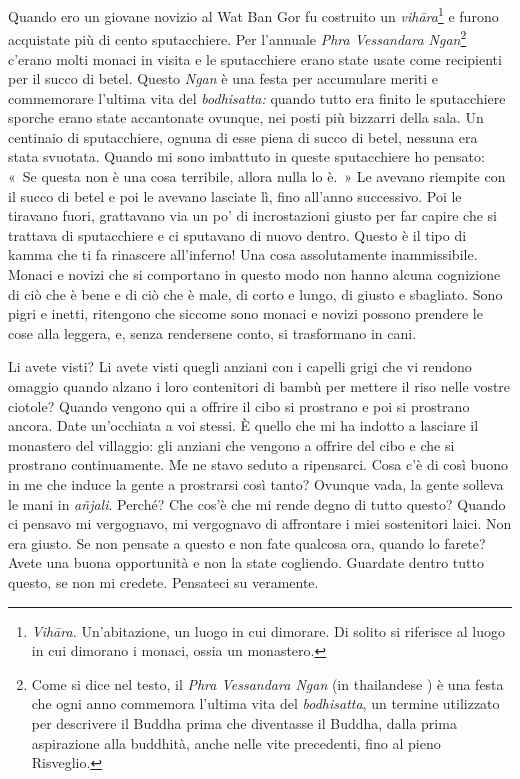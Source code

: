 Quando ero un giovane novizio al Wat Ban Gor fu costruito un
\emph{vihāra}\footnote{\emph{Vihāra.} Un'abitazione, un luogo in cui
  dimorare. Di solito si riferisce al luogo in cui dimorano i monaci,
  ossia un monastero.} e furono acquistate più di cento sputacchiere.
Per l'annuale \emph{Phra Vessandara Ngan}\footnote{Come si dice nel
  testo, il \emph{Phra Vessandara Ngan} (in thailandese ) è
  una festa che ogni anno commemora l'ultima vita del \emph{bodhisatta},
  un termine utilizzato per descrivere il Buddha prima che diventasse il
  Buddha, dalla prima aspirazione alla buddhità, anche nelle vite
  precedenti, fino al pieno Risveglio.} c'erano molti monaci in visita e
le sputacchiere erano state usate come recipienti per il succo di betel.
Questo \emph{Ngan} è una festa per accumulare meriti e commemorare
l'ultima vita del \emph{bodhisatta:} quando tutto era finito le
sputacchiere sporche erano state accantonate ovunque, nei posti più
bizzarri della sala. Un centinaio di sputacchiere, ognuna di esse piena
di succo di betel, nessuna era stata svuotata. Quando mi sono imbattuto
in queste sputacchiere ho pensato: «~Se questa non è una cosa terribile,
allora nulla lo è.~» Le avevano riempite con il succo di betel e poi le
avevano lasciate lì, fino all'anno successivo. Poi le tiravano fuori,
grattavano via un po' di incrostazioni giusto per far capire che si
trattava di sputacchiere e ci sputavano di nuovo dentro. Questo è il
tipo di kamma che ti fa rinascere all'inferno! Una cosa
assolutamente inammissibile. Monaci e novizi che si comportano in questo
modo non hanno alcuna cognizione di ciò che è bene e di ciò che è male,
di corto e lungo, di giusto e sbagliato. Sono pigri e inetti, ritengono
che siccome sono monaci e novizi possono prendere le cose alla leggera,
e, senza rendersene conto, si trasformano in cani.

Li avete visti? Li avete visti quegli anziani con i capelli grigi che vi
rendono omaggio quando alzano i loro contenitori di bambù per mettere il
riso nelle vostre ciotole? Quando vengono qui a offrire il cibo si
prostrano e poi si prostrano ancora. Date un'occhiata a voi stessi. È
quello che mi ha indotto a lasciare il monastero del villaggio: gli
anziani che vengono a offrire del cibo e che si prostrano continuamente.
Me ne stavo seduto a ripensarci. Cosa c'è di così buono in me che induce
la gente a prostrarsi così tanto? Ovunque vada, la gente solleva le mani
in \emph{añjali}. Perché? Che cos'è che mi rende degno di tutto questo?
Quando ci pensavo mi vergognavo, mi vergognavo di affrontare i miei
sostenitori laici. Non era giusto. Se non pensate a questo e non fate
qualcosa ora, quando lo farete? Avete una buona opportunità e non la
state cogliendo. Guardate dentro tutto questo, se non mi credete.
Pensateci su veramente.

